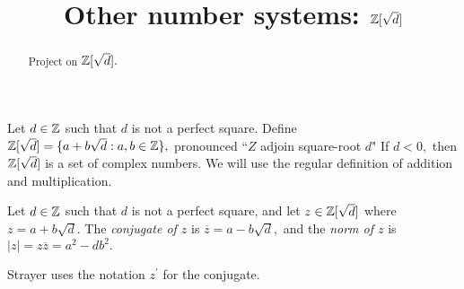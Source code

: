 \documentclass[letterpaper, 11 pt,handout]{ximera}
\title{Other number systems: $\mathbb Z[\sqrt{d}]$}
\begin{document}
\begin{abstract}
 Project on $\mathbb Z[\sqrt{d}].$
\end{abstract}
\maketitle

\begin{definition}
 Let $d\in\mathbb Z$ such that $d$ is not a perfect square. Define $\mathbb Z[\sqrt{d}]=\{a+b\sqrt{d}:a,b\in\mathbb Z\},$ pronounced ``$Z$ adjoin square-root $d$" If $d<0,$ then $\mathbb Z[\sqrt{d}]$ is a set of complex numbers. We will use the regular definition of addition and multiplication.
\end{definition}

\begin{definition}
	 Let $d\in\mathbb Z$ such that $d$ is not a perfect square, and let $z\in\mathbb Z[\sqrt{d}]$ where $z=a+b\sqrt{d}.$ The \emph{conjugate of $z$} is $\overline{z}=a-b\sqrt{d},$ and the \emph{norm of $z$} is $|z|=z\overline{z}=a^2-db^2.$
	 
	 Strayer uses the notation $z^\prime$ for the conjugate.
\end{definition}
\end{document}
